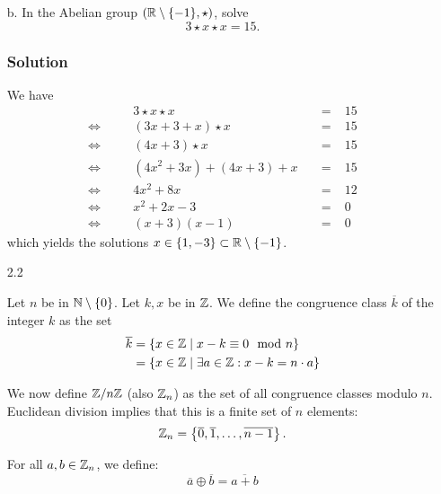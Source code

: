 \documentclass[11pt]{article}
\newcommand{\cls}[1]{\overline{#1}}
\begin{document}
\begin{enumerate}
    \item[b.] In the Abelian group $\left( \mathbb{R} \setminus \{-1\}, \star \right)$, solve
          \[
              3 \star x \star x = 15.
          \]

          \subsubsection*{Solution}

          We have
          \[
              \begin{alignedat}{3}
                            &  & 3 \star x \star x          &  & \; = \; & 15 \\
                  \iff\quad &  & (3x + 3 + x) \star x       &  & \; =\;  & 15 \\
                  \iff\quad &  & (4x + 3) \star x           &  & \; =\;  & 15 \\
                  \iff\quad &  & (4x^2 + 3x) + (4x + 3) + x &  & \; =\;  & 15 \\
                  \iff\quad &  & 4x^2 + 8x                  &  & \; =\;  & 12 \\
                  \iff\quad &  & x^2 + 2x -3                &  & \; =\;  & 0  \\
                  \iff\quad &  & (x + 3) (x - 1)            &  & \; =\;  & 0
              \end{alignedat}
          \]
          which yields the solutions $x \in \{1, -3\} \subset \mathbb{R} \setminus \{-1\}$.

    \item[2.2]

          Let $n$ be in $\mathbb{N} \setminus \{0\}$. Let $k, x$ be in $\mathbb{Z}$. We define the congruence class $\cls{k}$ of the
          integer $k$ as the set
          \[
              \begin{aligned}
                  \cls{k} & = \set{ x \in \Z \mid x - k \equiv 0 \mod n }               \\
                          & = \set{ x \in \Z \mid \exists a \in \Z: x - k = n \cdot a }
              \end{aligned}
          \]

          We now define $\mathbb{Z} / n\mathbb{Z}$ (also $\mathbb{Z}_n$) as the set of all congruence classes modulo $n$.
          Euclidean division implies that this is a finite set of $n$ elements:
          \[
              \Z_n = \set{ \cls{0}, \cls{1}, \ldots, \cls{n - 1} }.
          \]

          For all $a, b \in \mathbb{Z}_n$, we define:
          \[
              \cls{a} \oplus \cls{b} = \cls{a + b}
          \]


\end{enumerate}
\end{document}
